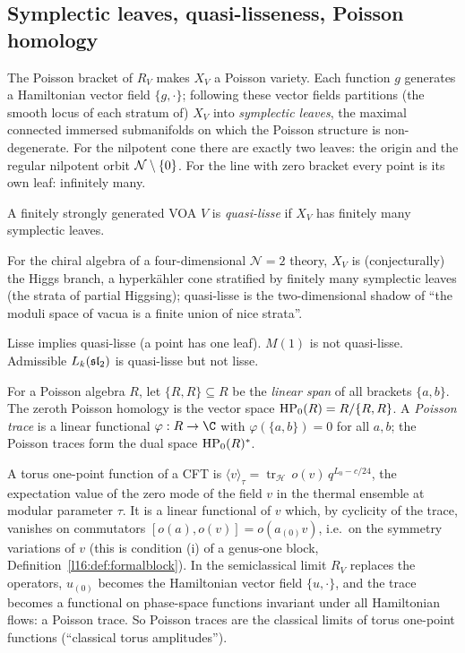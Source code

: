 \subsection{Symplectic leaves, quasi-lisseness, Poisson homology}

The Poisson bracket of $R_V$ makes $X_V$ a Poisson variety. Each function $g$ generates a Hamiltonian vector
field $\{g,\cdot\}$; following these vector fields partitions (the smooth locus of each stratum of) $X_V$ into
\emph{symplectic leaves}, the maximal connected immersed submanifolds on which the Poisson structure is
non-degenerate. For the nilpotent cone there are exactly two leaves: the origin and the regular nilpotent orbit
$\mathcal{N}\setminus\{0\}$. For the line with zero bracket every point is its own leaf: infinitely many.

\begin{definition}\label{l16:def:quasilisse}
A finitely strongly generated VOA $V$ is \emph{quasi-lisse} if $X_V$ has finitely many symplectic leaves.
\end{definition}

\begin{physics}
For the chiral algebra of a four-dimensional $\mathcal N=2$ theory, $X_V$ is (conjecturally) the Higgs branch, a
hyperk\"ahler cone stratified by finitely many symplectic leaves (the strata of partial Higgsing); quasi-lisse is the
two-dimensional shadow of ``the moduli space of vacua is a finite union of nice strata''.
\end{physics}

Lisse implies quasi-lisse (a point has one leaf). $M(1)$ is not quasi-lisse. Admissible $L_k(\mathfrak{sl}_2)$ is
quasi-lisse but not lisse.

\begin{definition}\label{l16:def:hp0}
For a Poisson algebra $R$, let $\{R,R\}\subseteq R$ be the \emph{linear span} of all brackets $\{a,b\}$. The
zeroth Poisson homology is the vector space $\mathrm{HP}_0(R) = R/\{R,R\}$. A \emph{Poisson trace} is a linear
functional $\varphi:R\to\C$ with $\varphi(\{a,b\})=0$ for all $a,b$; the Poisson traces form the dual space
$\mathrm{HP}_0(R)^*$.
\end{definition}

\begin{physics}
A torus one-point function of a CFT is $\langle v\rangle_\tau = \operatorname{tr}_{\mathcal H}\,o(v)\,q^{L_0-c/24}$, the
expectation value of the zero mode of the field $v$ in the thermal ensemble at modular parameter $\tau$. It is a linear
functional of $v$ which, by cyclicity of the trace, vanishes on commutators $[o(a),o(v)] = o(a_{(0)}v)$, i.e.\ on the symmetry
variations of $v$ (this is condition (i) of a genus-one block, Definition~\ref{l16:def:formalblock}). In the semiclassical
limit $R_V$ replaces the operators, $u_{(0)}$ becomes the Hamiltonian vector field $\{u,\cdot\}$, and the trace becomes a
functional on phase-space functions invariant under all Hamiltonian flows: a Poisson trace. So Poisson traces are the
classical limits of torus one-point functions (``classical torus amplitudes'').
\end{physics}

